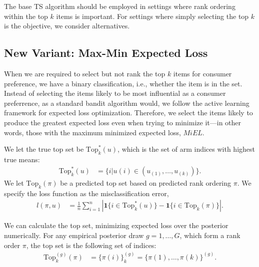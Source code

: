 \documentclass[a4paper,11pt]{article}
\newcommand{\numtopset}{k}
\newcommand{\topset}{\text{Top}_k}
\begin{document}
The base TS algorithm should be employed in settings where rank ordering within the top $k$ items is important. For settings where simply selecting the top $k$ is the objective, we consider alternatives.

\subsection{New Variant: Max-Min Expected Loss}

When we are required to select but not rank the top $k$ items for consumer preference, we have a binary classification, i.e., whether the item is in the set. Instead of selecting the items likely to be most influential as a consumer preferrence, as a standard bandit algorithm would, we follow the active learning framework for expected loss optimization. Therefore, we select the items likely to produce the greatest expected loss even when trying to minimize it---in other words, those with the maximum minimized expected loss, $MiEL$. 

We let the true top set be $\topset^{*}(u)$, which is the set of arm indices with highest true means:
\begin{align}
\topset^{*}(u) &= \{i | u(i) \in ( u_{(1)},\ldots,u_{(\numtopset)} ) \} .
\end{align}
We let $\topset(\pi)$ be a predicted top set based on predicted rank ordering $\pi$. We specify the loss function as the misclassification error,
\begin{align}
l(\pi,u) &= \frac{1}{n} \sum_{i=1}^{n} \left| \mathbf{1}\{ i \in \topset^{*}(u) \}-\mathbf{1}\{ i \in \topset(\pi) \} \right|.
\end{align}



We can calculate the top set, minimizing expected loss over the posterior numerically. For any empirical posterior draw $g=1,\ldots,G$, which form a rank order $\pi$, the top set is the following set of indices:
\begin{align}
\topset^{(g)}(\pi) &= \{ \pi(i) \}_k^{(g)} = \{ \pi(1),\ldots,\pi(k) \}^{(g)}.
\end{align}
\end{document}
